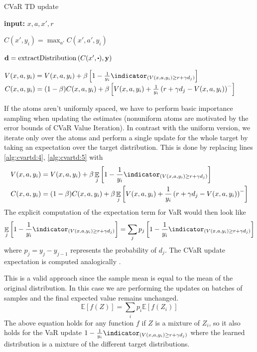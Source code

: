 \begin{algorithm}
\caption{CVaR TD update}
\begin{algorithmic}[1]\label{alg:cvartd}

    \STATE \textbf{input:} $x, a, x', r$
    
	\STATE $C(x', y_i) = \max_{a'} C(x', a', y_i)$ \label{alg:cvartd:1}
	\ENDFOR
	
	\STATE $\mathbf{d}= \text{extractDistribution}\bround{C(x', \bigcdot), \mathbf{y}}$ \label{alg:cvartd:2}

	\STATE $V(x, a, y_i) = V(x, a, y_i) + \beta \bsquare{1 - \frac{1}{y_i}\indicator_{(V(x, a, y_i) \ge r+\gamma d_j)}}$  \label{alg:cvartd:4}
	\STATE $C(x, a, y_i) = (1-\beta)C(x, a, y_i) + \beta\left[ {V(x, a, y_i) + \frac{1}{y_i}\left( {r+\gamma d_j - V(x, a, y_i)} \right)^-} \right]$\label{alg:cvartd:5}
	\ENDFOR
\end{algorithmic}
\end{algorithm}

If the atoms aren't uniformly spaced, we have to perform basic importance sampling when updating the estimates (nonuniform atoms are motivated by the error bounds of CVaR Value Iteration). In contrast with the uniform version, we iterate only over the atoms and perform a single update for the whole target by taking an expectation over the target distribution. This is done by replacing lines \ref{alg:cvartd:4}, \ref{alg:cvartd:5} with
\begin{equation}
\begin{split}
V(x, a, y_i) &= V(x, a, y_i) + \beta \expect_j\bsquare{1 - \frac{1}{y_i}\indicator_{(V(x, a, y_i) \ge r+\gamma d_j)}}\\
C(x, a, y_i) &= (1-\beta)C(x, a, y_i) + \beta\expect_j\bsquare{V(x, a, y_i) + \frac{1}{y_i}\bround{r+\gamma d_j - V(x, a, y_i)}^-}
\end{split}
\end{equation}
The explicit computation of the expectation term for VaR would then look like
\begin{equation*}
\expect_j\bsquare{1 - \frac{1}{y_i}\indicator_{(V(x, a, y_i) \ge r+\gamma d_j)}} = \sum_j p_j\bsquare{1 - \frac{1}{y_i}\indicator_{(V(x, a, y_i) \ge r+\gamma d_j)}}
\end{equation*}
where $p_j = y_{j}-y_{j-1}$ represents the probability of $d_j$. The CVaR update expectation is computed analogically .

This is a valid approach since the sample mean is equal to the mean of the original distribution. In this case we are performing the updates on batches of samples and the final expected value remains unchanged.
\begin{equation*}
\mathbb{E}[f(Z)] = \sum_i p_i \mathbb{E}[f(Z_i)]
\end{equation*}
The above equation holds for any function $f$ if $Z$ is a mixture of $Z_i$, so it also holds for the VaR update $1 - \frac{1}{y_i}\indicator_{(V(x, a, y_i) \ge r+\gamma d_j)}$ where the learned distribution is a mixture of the different target distributions.

